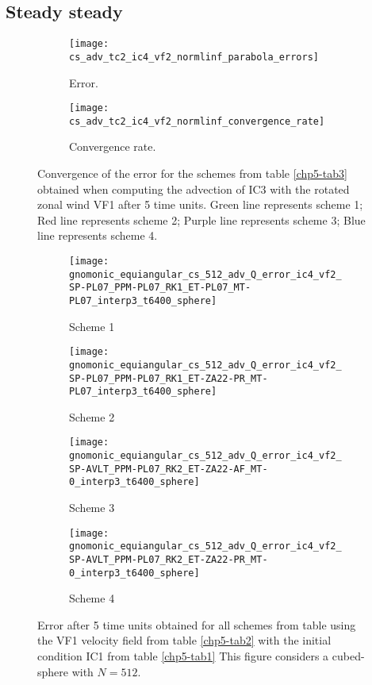 \newpage
\subsection{Steady steady}
\begin{figure}[!htb]
	\centering
	\begin{subfigure}{0.42\textwidth}
		\centering
		\texttt{[image: cs\_adv\_tc2\_ic4\_vf2\_normlinf\_parabola\_errors]}
		\caption{Error.\label{chp5-adv2-error}}
	\end{subfigure}
	\begin{subfigure}{0.42\textwidth}
		\centering
		\texttt{[image: cs\_adv\_tc2\_ic4\_vf2\_normlinf\_convergence\_rate]}
		\caption{Convergence rate.\label{chp5-adv2-cr}}
	\end{subfigure}
	\caption{Convergence of the error for the schemes from table \ref{chp5-tab3} obtained when computing the advection of IC3  with the rotated zonal wind VF1 after 5 time units.
	Green line represents scheme 1;
	Red line represents scheme 2;
	Purple line represents scheme 3;
	Blue line represents scheme 4.
		\label{chp5-error-adv2}}
\end{figure}


\begin{figure}[!htb]
	\centering
	\begin{subfigure}{0.3\textwidth}
		\centering
		\texttt{[image: gnomonic\_equiangular\_cs\_512\_adv\_Q\_error\_ic4\_vf2\_SP-PL07\_PPM-PL07\_RK1\_ET-PL07\_MT-PL07\_interp3\_t6400\_sphere]}
		\caption{Scheme 1 \label{chp5-adv2-s1}}
	\end{subfigure}
	\begin{subfigure}{0.3\textwidth}
		\centering
		\texttt{[image: gnomonic\_equiangular\_cs\_512\_adv\_Q\_error\_ic4\_vf2\_SP-PL07\_PPM-PL07\_RK1\_ET-ZA22-PR\_MT-PL07\_interp3\_t6400\_sphere]}
		\caption{Scheme 2 \label{chp5-adv2-s2}}
	\end{subfigure}
	
	\begin{subfigure}{0.3\textwidth}
		\centering
		\texttt{[image: gnomonic\_equiangular\_cs\_512\_adv\_Q\_error\_ic4\_vf2\_SP-AVLT\_PPM-PL07\_RK2\_ET-ZA22-AF\_MT-0\_interp3\_t6400\_sphere]}
		\caption{Scheme 3 \label{chp5-adv2-s3}}
	\end{subfigure}
	\begin{subfigure}{0.3\textwidth}
		\centering
		\texttt{[image: gnomonic\_equiangular\_cs\_512\_adv\_Q\_error\_ic4\_vf2\_SP-AVLT\_PPM-PL07\_RK2\_ET-ZA22-PR\_MT-0\_interp3\_t6400\_sphere]}
		\caption{Scheme 4 \label{chp5-adv2-s4}}
	\end{subfigure}
	\caption{ Error after 5 time units obtained for all schemes from table using the VF1 velocity field from table \ref{chp5-tab2} with the initial condition IC1 from  table \ref{chp5-tab1} 
		This figure considers a cubed-sphere with $N=512$. \label{chp5-adv2}}
\end{figure}
